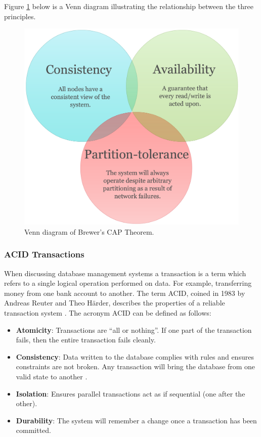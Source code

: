 Figure \ref{fig:venncap} below is a Venn diagram illustrating the relationship between the three principles.
\begin{figure}[h]\begin{center}\includegraphics[width=1\linewidth]{images/venncap}\caption{Venn diagram of Brewer's CAP Theorem.}\label{fig:venncap}\end{center}\end{figure}

\subsubsection{ACID Transactions}\label{acid}
When discussing database management systems a transaction is a term which refers to a single logical operation performed on data. For example, transferring money from one bank account to another. The term ACID, coined in 1983 by Andreas Reuter and Theo Härder, describes the properties of a reliable transaction system \cite{acid}. The acronym ACID can be defined as follows:

\begin{itemize}
\item \textbf{Atomicity}: Transactions are ``all or nothing''. If one part of the transaction fails, then the entire transaction fails cleanly.
\item \textbf{Consistency}: Data written to the database complies with rules and ensures constraints are not broken. Any transaction will bring the database from one valid state to another \cite{acidtrans}.
\item \textbf{Isolation}: Ensures parallel transactions act as if sequential (one after the other).
\item \textbf{Durability}: The system will remember a change once a transaction has been committed.
\end{itemize}


